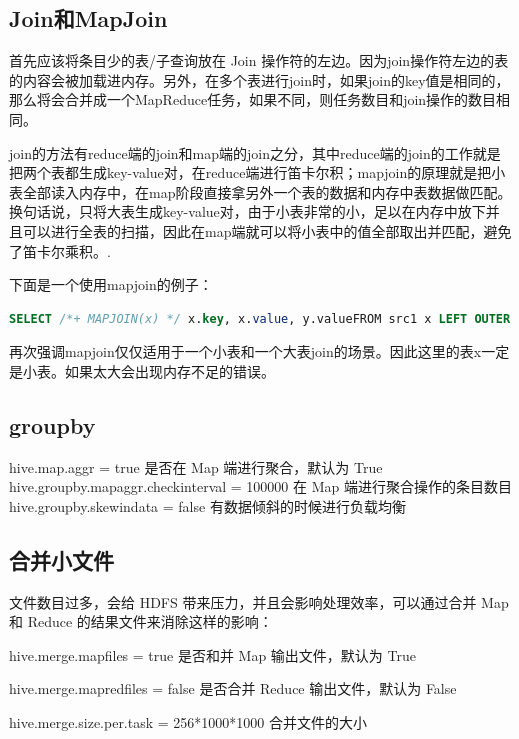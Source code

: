 \subsection{Join和MapJoin}
首先应该将条目少的表/子查询放在 Join 操作符的左边。因为join操作符左边的表的内容会被加载进内存。另外，在多个表进行join时，如果join的key值是相同的，那么将会合并成一个MapReduce任务，如果不同，则任务数目和join操作的数目相同。


join的方法有reduce端的join和map端的join之分，其中reduce端的join的工作就是把两个表都生成key-value对，在reduce端进行笛卡尔积；mapjoin的原理就是把小表全部读入内存中，在map阶段直接拿另外一个表的数据和内存中表数据做匹配。换句话说，只将大表生成key-value对，由于小表非常的小，足以在内存中放下并且可以进行全表的扫描，因此在map端就可以将小表中的值全部取出并匹配，避免了笛卡尔乘积。\cite{mapjoin}.


下面是一个使用mapjoin的例子：

\begin{lstlisting}[language=SQL]
SELECT /*+ MAPJOIN(x) */ x.key, x.value, y.valueFROM src1 x LEFT OUTER JOIN src y ON (x.key = y.key);
\end{lstlisting}

再次强调mapjoin仅仅适用于一个小表和一个大表join的场景。因此这里的表x一定是小表。如果太大会出现内存不足的错误。

\subsection{groupby}
hive.map.aggr = true 是否在 Map 端进行聚合，默认为 True 
hive.groupby.mapaggr.checkinterval = 100000 在 Map 端进行聚合操作的条目数目 
hive.groupby.skewindata = false 有数据倾斜的时候进行负载均衡 

\subsection{合并小文件}
文件数目过多，会给 HDFS 带来压力，并且会影响处理效率，可以通过合并 Map 和 Reduce 的结果文件来消除这样的影响：
\begin{compactitem}
\item hive.merge.mapfiles = true 是否和并 Map 输出文件，默认为 True 
\item hive.merge.mapredfiles = false 是否合并 Reduce 输出文件，默认为 False 
\item hive.merge.size.per.task = 256*1000*1000 合并文件的大小 
\end{compactitem}

